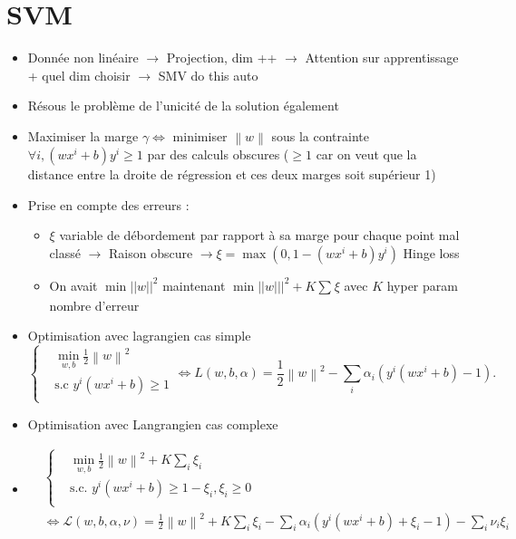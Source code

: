 \documentclass{article}
\theoremstyle{plain}%
\theoremstyle{definition}
\theoremstyle{remark}
\begin{document}
\section{SVM}
\begin{itemize}
    \item Donnée non linéaire $\rightarrow$ Projection, dim ++ $\rightarrow$ Attention sur apprentissage + quel dim choisir $\rightarrow$ SMV do this auto
    \item Résous le problème de l'unicité de la solution également
    \item Maximiser la marge $ \gamma  \Leftrightarrow $ minimiser $ \left\| w \right\| $ sous la contrainte $ \forall i, (wx^i + b)y^i \geq 1 $ par des calculs obscures ($ \geq 1 $ car on veut que la distance entre la droite de régression et ces deux marges soit supérieur 1)
    \item Prise en compte des erreurs : \begin{itemize}
        \item $ \xi  $ variable de débordement par rapport à sa marge pour chaque point mal classé $\rightarrow$ Raison obscure $\rightarrow \xi = \max (0, 1 - (wx^i + b) y^i) $ Hinge loss
        \item On avait $\min ||w||^2$ maintenant $\min ||w|||^2 + K \sum_{}^{}\xi $ avec $K$ hyper param nombre d'erreur
    \end{itemize}
    \item Optimisation avec lagrangien cas simple
    \[
        \begin{cases}
            & \min _{w,b} \frac{1}{2}\left\| w \right\| ^2\\
        &\text{s.c } y^i (wx^i + b) \geq 1\\
    \end{cases} 
        \Leftrightarrow L(w, b, \alpha) = \frac{1}{2} \left\| w \right\| ^2 - \sum_{i}^{}\alpha _i (y^i (wx^i + b) - 1)
    .\]
    \item Optimisation avec Langrangien cas complexe 
    \item \begin{align*}
        &\begin{cases}
            &\min _{w,b} \frac{1}{2}\left\| w \right\| ^2 + K \sum_{i}^{}\xi _i \\
            &\text{s.c. } y^i (wx^i + b) \geq 1 - \xi _i, \xi _i \geq 0 \\
        \end{cases} \\ 
        &\Leftrightarrow \mathcal{L}(w, b, \alpha , \nu ) = \frac{1}{2}\left\| w \right\| ^2 + K \sum_{i}^{} \xi _i - \sum_{i}^{}\alpha _i (y^i(w x^i + b) + \xi _i - 1) - \sum_{i}^{}\nu _i \xi _i 
    \end{align*}
        
\end{itemize}
\end{document}
